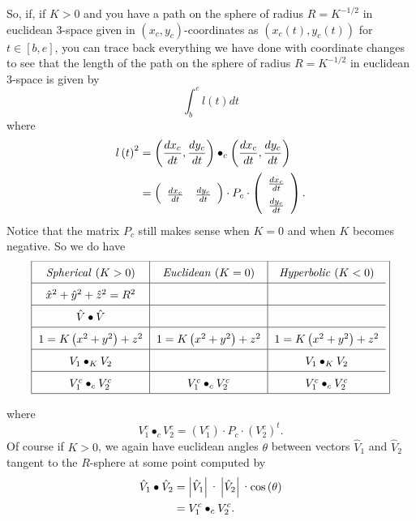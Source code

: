 So, if, if $K>0$ and you have a path on the sphere of radius $R=K^{-1/2}$ in
euclidean $3$-space given in $\left(  x_{c},y_{c}\right)  $-coordinates as
$\left(  x_{c}\left(  t\right)  ,y_{c}\left(  t\right)  \right)  $ for
$t\in\left[  b,e\right]  $, you can trace back everything we have done with
coordinate changes to see that the length of the path on the sphere of radius
$R=K^{-1/2}$ in euclidean $3$-space is given by%
\[%
{\displaystyle\int\nolimits_{b}^{e}}
l\left(  t\right)  dt
\]
where%
\begin{align*}
l\left(  t\right)  ^{2}  &  =\left(  \frac{dx_{c}}{dt},\frac{dy_{c}}%
{dt}\right)  \bullet_{c}\left(  \frac{dx_{c}}{dt},\frac{dy_{c}}{dt}\right) \\
&  =\left(
\begin{array}
[c]{cc}%
\frac{dx_{c}}{dt} & \frac{dy_{c}}{dt}%
\end{array}
\right)  \cdot P_{c}\cdot\left(
\begin{array}
[c]{c}%
\frac{dx_{c}}{dt}\\
\frac{dy_{c}}{dt}%
\end{array}
\right)  .
\end{align*}
Notice that the matrix $P_{c}$ still makes sense when $K=0$ and when $K$
becomes negative. So we do have%
\[{\renewcommand{\arraystretch}{1.6}
\frame{%
\begin{tabular}
[c]{c|c|c}%
\textit{Spherical} ($K>0$) & \textit{Euclidean} ($K=0$) & \textit{Hyperbolic}
($K<0$)\\\hline
$\hat{x}^{2}+\hat{y}^{2}+\hat{z}^{2}=R^{2}$ &  & \\ \hline
$\hat{V}\bullet\hat{V}$ &  & \\ \hline
$1=K\left(  x^{2}+y^{2}\right)  +z^{2}$ & $1=K\left(  x^{2}+y^{2}\right)
+z^{2}$ & $1=K\left(  x^{2}+y^{2}\right)  +z^{2}$\\ \hline
$V_{1}\bullet_{K}V_{2}$ &  & $V_{1}\bullet_{K}V_{2}$\\ \hline
$V_{1}^{c}\bullet_{c}V_{2}^{c}$ & $V_{1}^{c}\bullet_{c}V_{2}^{c}$ & $V_{1}%
^{c}\bullet_{c}V_{2}^{c}$%
\end{tabular}
}}
\]
where%
\[
V_{1}^{c}\bullet_{c}V_{2}^{c}=\left(  V_{1}^{c}\right)  \cdot P_{c}%
\cdot\left(  V_{2}^{c}\right)  ^{t}.
\]
Of course if $K>0$, we again have euclidean angles $\theta$ between vectors
$\hat{V}_{1}$ and $\hat{V}_{2}$ tangent to the $R$-sphere at some point
computed by%
\begin{align*}
\hat{V}_{1}\bullet\hat{V}_{2}  &  =\left\vert \hat{V}_{1}\right\vert
\text{\textperiodcentered}\left\vert \hat{V}_{2}\right\vert
\text{\textperiodcentered\textrm{cos}}\left(  \theta\right) \\
&  =V_{1}^{c}\bullet_{c}V_{2}^{c}.
\end{align*}


